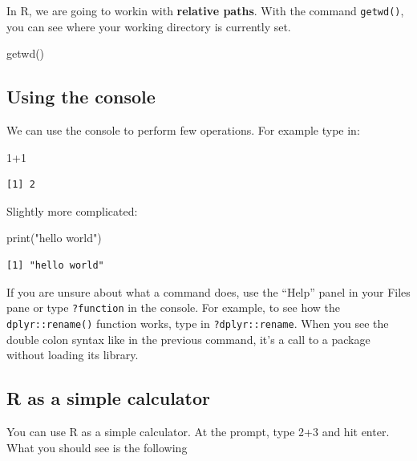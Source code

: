 \documentclass[
  letterpaper,
  DIV=11,
  numbers=noendperiod]{scrreprt}
\newenvironment{Shaded}{\begin{snugshade}}{\end{snugshade}}
\newcommand{\DecValTok}[1]{\textcolor[rgb]{0.68,0.00,0.00}{#1}}
\newcommand{\FunctionTok}[1]{\textcolor[rgb]{0.28,0.35,0.67}{#1}}
\newcommand{\NormalTok}[1]{\textcolor[rgb]{0.00,0.23,0.31}{#1}}
\newcommand{\SpecialCharTok}[1]{\textcolor[rgb]{0.37,0.37,0.37}{#1}}
\newcommand{\StringTok}[1]{\textcolor[rgb]{0.13,0.47,0.30}{#1}}
\begin{document}
In R, we are going to workin with \textbf{relative paths}. With the
command \texttt{getwd()}, you can see where your working directory is
currently set.

\begin{Shaded}
\begin{Highlighting}[]
\FunctionTok{getwd}\NormalTok{() }
\end{Highlighting}
\end{Shaded}

\subsection{Using the console}\label{using-the-console}

We can use the console to perform few operations. For example type in:

\begin{Shaded}
\begin{Highlighting}[]
\DecValTok{1}\SpecialCharTok{+}\DecValTok{1}
\end{Highlighting}
\end{Shaded}

\begin{verbatim}
[1] 2
\end{verbatim}

Slightly more complicated:

\begin{Shaded}
\begin{Highlighting}[]
\FunctionTok{print}\NormalTok{(}\StringTok{"hello world"}\NormalTok{)}
\end{Highlighting}
\end{Shaded}

\begin{verbatim}
[1] "hello world"
\end{verbatim}

If you are unsure about what a command does, use the ``Help'' panel in
your Files pane or type \texttt{?function} in the console. For example,
to see how the \texttt{dplyr::rename()} function works, type in
\texttt{?dplyr::rename}. When you see the double colon syntax like in
the previous command, it's a call to a package without loading its
library.

\subsection{R as a simple calculator}\label{r-as-a-simple-calculator}

You can use R as a simple calculator. At the prompt, type 2+3 and hit
enter. What you should see is the following
\end{document}

